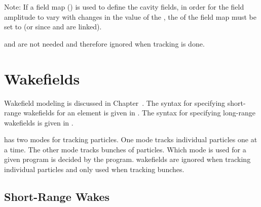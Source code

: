 Note: If a field map () is used to define the cavity fields, in order for the
field amplitude to vary with changes in the value of the , the  of
the field map must be set to  (or  since  and 
are linked).

 and  are not needed and therefore ignored when
 tracking is done.

\section{Wakefields}
\label{s:wakes}

Wakefield modeling is discussed in Chapter~. The syntax for specifying
short-range wakefields for an element is given in . The syntax for specifying
long-range wakefields is given in .

\bmad has two modes for tracking particles. One mode tracks individual particles one at a time. The
other mode tracks bunches of particles. Which mode is used for a given program is decided by the
program. wakefields are ignored when tracking individual particles and only used when tracking
bunches.

\subsection{Short-Range Wakes}
\label{s:sr.wake.syntax}

